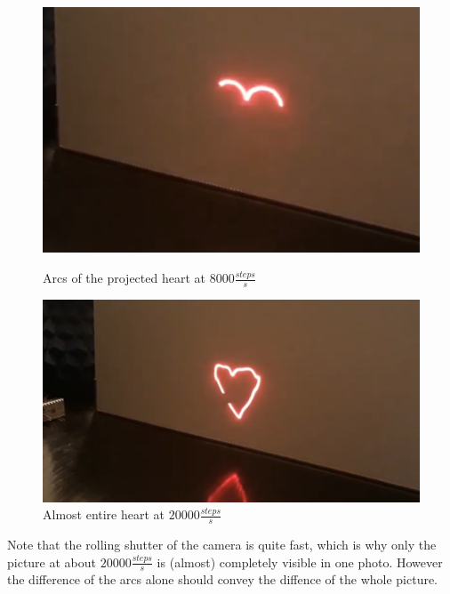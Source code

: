 \documentclass[a4paper, 11pt]{scrartcl}
\begin{document}
\begin{figure}[!h]
\noindent
\begin{minipage}{0.4\textwidth}%
\includegraphics[width=\textwidth]{img/hearttestslow}
\caption{Arcs of the projected heart at $8000 \frac{steps}{s}$}
\label{slow}
\end{minipage}%
\hfill
\begin{minipage}{0.4\textwidth}%
\includegraphics[width=\textwidth]{img/hearttest}
\caption{Almost entire heart at $20000 \frac{steps}{s}$}
\label{fast}
\end{minipage}%
\end{figure}
Note that the rolling shutter of the camera is quite fast, which is why only the picture at about $20000 \frac{steps}{s}$ is (almost) completely visible in one photo. However the difference of the arcs alone should convey the diffence of the whole picture. \\
\end{document}
